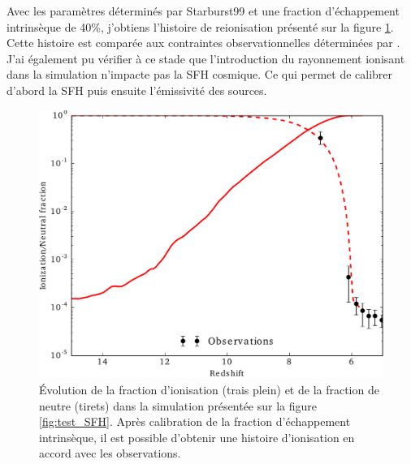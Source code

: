 Avec les paramètres déterminés par Starburst99 et une fraction d'échappement intrinsèque de 40\%, j'obtiens l'histoire de reionisation présenté sur la figure \ref{fig:test_xion}.
Cette histoire est comparée aux contraintes observationnelles déterminées par \cite{fan_constraining_2006}.
J'ai également pu vérifier à ce stade que l'introduction du rayonnement ionisant dans la simulation n'impacte pas la \ac{SFH} cosmique.
Ce qui permet de calibrer d'abord la \ac{SFH} puis ensuite l'émissivité des sources.







%

\begin{figure}
        \includegraphics[width=.95\linewidth]{img/02/xion.pdf} 
        \caption[Histoire d'ionisation]{Évolution de la fraction d'ionisation (trais plein) et de la fraction de neutre (tirets) dans la simulation présentée sur la figure \ref{fig:test_SFH}.
        Après calibration de la fraction d’échappement intrinsèque, il est possible d'obtenir une histoire d'ionisation en accord avec les observations.
 		\label{fig:test_xion}}
\end{figure}

